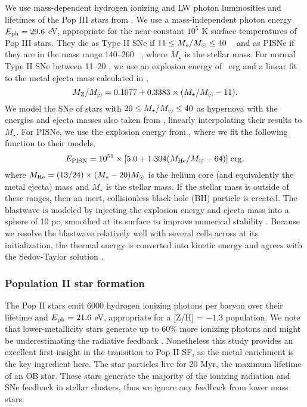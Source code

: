 \documentclass[apj]{emulateapj}
\begin{document}
We use mass-dependent hydrogen ionizing and LW photon luminosities and
lifetimes of the Pop III stars from \citet{Schaerer02}.  We use a
mass-independent photon energy $E_{\rm ph} = 29.6$ eV, appropriate for
the near-constant $10^5$ K surface temperatures of Pop III stars.
They die as Type II SNe if $11 \le M_\star/\Ms \le 40$
\Ms~\citep{Woosley95} and as PISNe if they are in the mass range
140--260 \Ms~\citep{Heger03}, where $M_\star$ is the stellar mass.
For normal Type II SNe between 11--20 \Ms, we use an explosion energy
of ~erg and a linear fit to the metal ejecta mass calculated
in \citet{Nomoto06},
%
\begin{equation}
  \label{eqn:typeii}
  M_{\rm Z}/\Ms = 0.1077 + 0.3383 \times (M_\star/\Ms - 11).
\end{equation}
%
We model the SNe of stars with $20 \le M_\star/\Ms \le 40$ as
hypernova with the energies and ejecta masses also taken from
\citeauthor{Nomoto06}, linearly interpolating their results to
$M_\star$.  For PISNe, we use the explosion energy from
\citet{Heger02}, where we fit the following function to their models,
%
\begin{equation}
  \label{eqn:pisn}
  E_{\rm PISN} = 10^{51} \times [5.0 + 1.304 (M_{\rm He}/\Ms - 64)] \;
  \mathrm{erg},
\end{equation}
%
where $M_{\rm He} = (13/24) \times (M_\star - 20) \Ms$ is the helium
core (and equivalently the metal ejecta) mass and $M_\star$ is the
stellar mass.  If the stellar mass is outside of these ranges, then an
inert, collisionless black hole (BH) particle is created.  The
blastwave is modeled by injecting the explosion energy and ejecta mass
into a sphere of 10 pc, smoothed at its surface to improve numerical
stability \citep{Wise08_Gal}.  Because we resolve the blastwave
relatively well with several cells across at its initialization, the
thermal energy is converted into kinetic energy and agrees with the
Sedov-Taylor solution \citep[e.g.][]{Greif07}.

\subsubsection{Population II star formation}

The Pop II stars emit 6000 hydrogen ionizing photons per baryon over
their lifetime and $E_{\rm ph} = 21.6$ eV, appropriate for a [Z/H] =
$-1.3$ population.  We note that lower-metallicity stars generate up
to 60\% more ionizing photons and might be underestimating the
radiative feedback \citep{Schaerer03}.  Nonetheless this study
provides an excellent first insight in the transition to Pop II SF, as
the metal enrichment is the key ingredient here.  The star particles
live for 20 Myr, the maximum lifetime of an OB star.  These stars
generate the majority of the ionizing radiation and SNe feedback in
stellar clusters, thus we ignore any feedback from lower mass stars.
\end{document}
